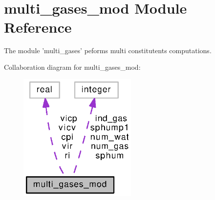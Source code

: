 \section{multi\-\_\-gases\-\_\-mod Module Reference}
\label{classmulti__gases__mod}


The module 'multi\-\_\-gases' peforms multi constitutents computations.  




Collaboration diagram for multi\-\_\-gases\-\_\-mod\-:
\nopagebreak
\begin{figure}[H]
\begin{center}
\leavevmode
\includegraphics[width=165pt]{classmulti__gases__mod__coll__graph}
\end{center}
\end{figure}
